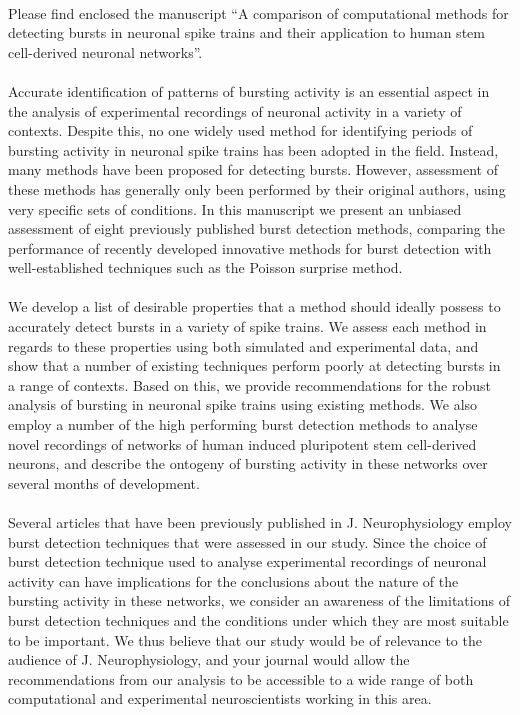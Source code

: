 \documentclass[usebwarms,a4paper,nofold]{damtplet}
\begin{document}
\begin{letter}{}{
		
		\\
		\\\\
		\\
		\\
		\\
		 }
%
%
{

 Please find enclosed the manuscript ``A comparison of computational methods for detecting bursts in neuronal spike trains and their application to human stem cell-derived neuronal networks''. 
 \\ \\Accurate identification of patterns of bursting activity is an essential aspect in the analysis of experimental recordings of neuronal activity in a variety of contexts. Despite this, no one widely used method for identifying periods of bursting activity in neuronal spike trains has been adopted in the field. Instead, many methods have been proposed for detecting bursts. However, assessment of these methods has generally only been performed by their original authors, using very specific sets of conditions. In this manuscript we present an unbiased assessment of eight previously published burst detection methods, comparing the performance of recently developed innovative methods for burst detection with well-established techniques such as the Poisson surprise method.
 \\ \\We develop a list of desirable properties that a method should ideally possess to accurately detect bursts in a variety of spike trains. We assess each method in regards to these properties using both simulated and experimental data, and show that a number of existing techniques perform poorly at detecting bursts in a range of contexts. Based on this, we provide recommendations for the robust analysis of bursting in neuronal spike trains using existing methods. We also employ a number of the high performing burst detection methods to analyse novel recordings of networks of human induced pluripotent stem cell-derived neurons, and describe the ontogeny of bursting activity in these networks over several months of development.
  \\ \\Several articles that have been previously published in J. Neurophysiology employ burst detection techniques that were assessed in our study. Since the choice of burst detection technique used to analyse experimental recordings of neuronal activity can have implications for the conclusions about the nature of the bursting activity in these networks, we consider an awareness of the limitations of burst detection techniques and the conditions under which they are most suitable to be important. We thus believe that our study would be of relevance to the audience of J. Neurophysiology, and your journal would allow the recommendations from our analysis to be accessible to a wide range of both computational and experimental neuroscientists working in this area.
}
\end{letter}
\end{document}
